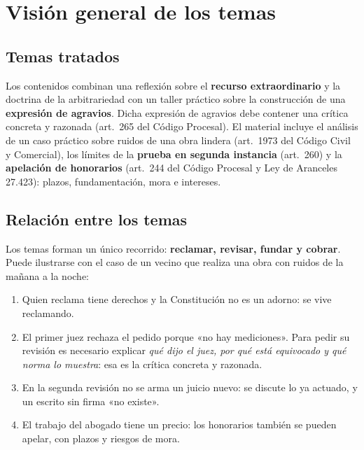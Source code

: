 \documentclass[12pt,oneside]{book}
\begin{document}

\chapter[Visión general]{Visión general de los temas}

\section{Temas tratados}

Los contenidos combinan una reflexión sobre el \textbf{recurso extraordinario} y la doctrina de la arbitrariedad con un taller práctico sobre la construcción de una \textbf{expresión de agravios}. Dicha expresión de agravios debe contener una crítica concreta y razonada (art.~265 del Código Procesal). El material incluye el análisis de un caso práctico sobre ruidos de una obra lindera (art.~1973 del Código Civil y Comercial), los límites de la \textbf{prueba en segunda instancia} (art.~260) y la \textbf{apelación de honorarios} (art.~244 del Código Procesal y Ley de Aranceles 27.423): plazos, fundamentación, mora e intereses.

\section{Relación entre los temas}

Los temas forman un único recorrido: \textbf{reclamar, revisar, fundar y cobrar}. Puede ilustrarse con el caso de un vecino que realiza una obra con ruidos de la mañana a la noche:

\begin{enumerate}
    \item Quien reclama tiene derechos y la Constitución no es un adorno: se vive reclamando.
    \item El primer juez rechaza el pedido porque «no hay mediciones». Para pedir su revisión es necesario explicar \emph{qué dijo el juez, por qué está equivocado y qué norma lo muestra}: esa es la crítica concreta y razonada.
    \item En la segunda revisión no se arma un juicio nuevo: se discute lo ya actuado, y un escrito sin firma «no existe».
    \item El trabajo del abogado tiene un precio: los honorarios también se pueden apelar, con plazos y riesgos de mora.
\end{enumerate}
\end{document}
